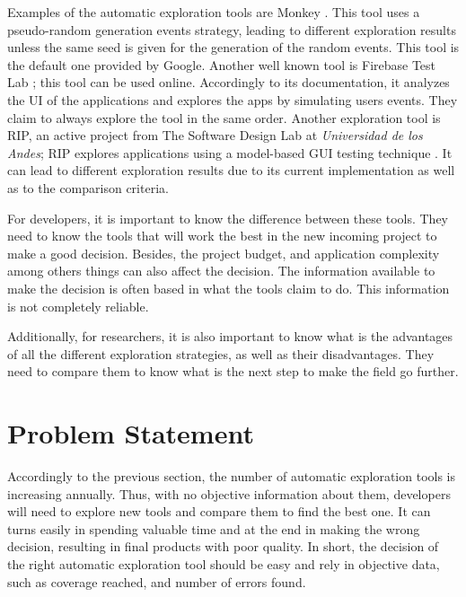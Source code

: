 Examples of the automatic exploration tools are Monkey \MARIO{[CITE]}. This tool uses a pseudo-random generation events strategy, leading to different exploration results unless the same seed is given for the generation of the random events. This tool is the default one provided by Google. Another well known tool is Firebase Test Lab ; this tool can be used online. Accordingly to its documentation, it analyzes the UI of the applications and explores the apps by simulating users events. They claim to always explore the tool in the same order. Another exploration tool is RIP, an active project from  The Software Design Lab at \emph{Universidad de los Andes}; RIP explores applications using a model-based GUI testing technique . It can lead to different exploration results due to its current implementation as well as to the comparison criteria. 

For developers, it  is important to know the difference between these tools. They need to know the tools that will work the best in the new incoming project to make a good decision. Besides, the project budget, and application complexity among others things can also affect the decision. The information available to make the decision is often based in what the tools claim to do. This information is not completely reliable.

Additionally, for researchers, it is also important to know what is the advantages of all the different exploration strategies, as well as their disadvantages. They need to compare them to know what is the next step to make the field go further.


\section{Problem Statement}

Accordingly to the previous section, the number of automatic exploration tools is increasing annually. Thus, with no objective information about them, developers  will need to explore new tools and compare them to find the best one. It can turns easily in spending valuable time and at the end in making the wrong decision, resulting in final products with poor quality. In short, the decision of the right automatic exploration tool should be easy and rely in objective data, such as coverage reached, and number of errors found.

